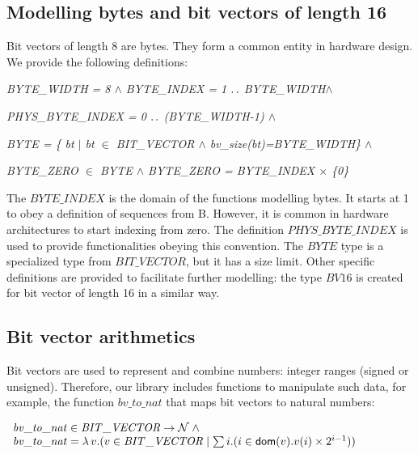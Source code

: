 \documentclass[11pt]{article} %
\begin{document}
\subsection{Modelling bytes and bit vectors of length 16}

Bit vectors of length 8 are bytes. They form a common entity in
hardware design. We provide the following definitions:


\hspace*{0.0in}\it BYTE\_WIDTH \rm = 8 $\land$ \it BYTE\_INDEX \rm = 1 $\mathbin{\ldotp\ldotp}$ \rm  BYTE\_WIDTH\rm $\land$

\hspace*{0.0in}\it PHYS\_BYTE\_INDEX \rm = \rm 0 $\mathbin{\ldotp\ldotp}$ \rm (\it BYTE\_WIDTH\rm -\rm 1\rm )\hspace*{0.10in} $\land$

\hspace*{0.0in}\it BYTE \rm = \rm \{ \it bt  $\mid$  \it bt $\in$ \it BIT\_VECTOR  $\land$  \it bv\_size\rm (\it bt\rm )\rm =\it BYTE\_WIDTH\rm \}\hspace*{0.10in} $\land$

\hspace*{0.0in}\it BYTE\_ZERO  $\in$  \it BYTE  $\land$ \it BYTE\_ZERO \rm = \it BYTE\_INDEX  $\times$  \rm \{\rm 0\rm \}

The $\mathit{BYTE\_INDEX}$ is the domain of the functions modelling bytes. It starts at 1 to obey a
definition of sequences from B. However, it is common in hardware architectures to start indexing from
zero. The definition $\mathit{PHYS\_BYTE\_INDEX}$ is used to provide functionalities obeying this
convention. The $\mathit{BYTE}$ type is a specialized type from $\mathit{BIT\_VECTOR}$, but it has a size
limit. Other specific definitions are provided to facilitate further modelling: the type $\mathit{BV16}$
is created for bit vector of length 16 in a similar way.



\subsection{Bit vector arithmetics}

Bit vectors are used to represent and combine numbers: integer ranges (signed or unsigned). Therefore, our
library includes functions to manipulate such data, for example, the function $\mathit{bv\_to\_nat}$ that
maps bit vectors to natural numbers:



$
\begin{array}{l}
\mathit{bv\_to\_nat} \in \mathit{BIT\_VECTOR} \fun \nat \land \\
\mathit{bv\_to\_nat} = \lambda v . (v \in \mathit{BIT\_VECTOR} \mid \sum i . (i \in \dom(v) . v(i)
\times 2^{i-1}))
\end{array}
$
\end{document}

